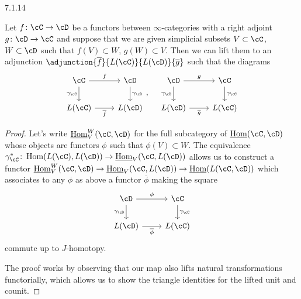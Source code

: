 \documentclass[a4paper,12pt]{scrartcl}
\begin{document}
\begin{prop}
  7.1.14

  Let $f\colon\cC\rightarrow\cD$ be a functors between $\infty$-categories with
  a right adjoint $g\colon\cD\rightarrow\cC$ and suppose that we are given
  simplicial subsets $V\subset\cC$, $W\subset\cD$ such that $f(V)\subset W$,
  $g(W)\subset V$. Then we can lift them to an adjunction
  $\adjunction{\overline{f}}{L(\cC)}{L(\cD)}{\overline{g}}$ such that the
  diagrams
  \[\begin{tikzcd}
    \cC & \cD \\
    {L(\cC)} & {L(\cD)}
    \arrow["{\gamma_\cD}", from=1-2, to=2-2]
    \arrow["{\gamma_\cC}"', from=1-1, to=2-1]
    \arrow["{\overline{f}}"', from=2-1, to=2-2]
    \arrow["f", from=1-1, to=1-2]
  \end{tikzcd},
  \quad
  \begin{tikzcd}
    \cD & \cC \\
    {L(\cD)} & {L(\cC)}
    \arrow["{\gamma_\cC}", from=1-2, to=2-2]
    \arrow["{\gamma_\cD}"', from=1-1, to=2-1]
    \arrow["{\overline{g}}"', from=2-1, to=2-2]
    \arrow["g", from=1-1, to=1-2]
  \end{tikzcd}
  \]
\end{prop}
\begin{proof}
  Let's write $\Home_V^W(\cC,\cD)$ for the full subcategory of $\Home(\cC,\cD)$
  whose objects are functors $\phi$ such that $\phi(V)\subset W$. The
  equivalence
  $\gamma^*_\cC\colon\Hom(L(\cC),L(\cD))\rightarrow\Home_V(\cC,L(\cD))$ allows
  us to construct a functor
  $\Home^W_V(\cC,\cD)\rightarrow\Home_V(\cC,L(\cD))\rightarrow\Home(L(\cC,\cD))$
  which associates to any $\phi$ as above a functor $\overline{\phi}$ making the
  square
  \[\begin{tikzcd}
    \cD & \cC \\
    {L(\cD)} & {L(\cC)}
    \arrow["{\gamma_\cC}", from=1-2, to=2-2]
    \arrow["{\gamma_\cD}"', from=1-1, to=2-1]
    \arrow["{\overline{\phi}}"', from=2-1, to=2-2]
    \arrow["\phi", from=1-1, to=1-2]
  \end{tikzcd}\]
  commute up to $J$-homotopy.

  The proof works by observing that our map also lifts natural transformations
  functorially, which allows us to show the triangle identities for the lifted
  unit and counit.
\end{proof}
\end{document}
